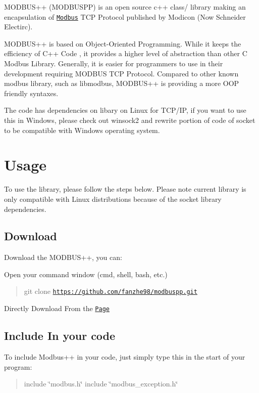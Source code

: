 M\+O\+D\+B\+U\+S++ (M\+O\+D\+B\+U\+S\+PP) is an open source c++ class/ library making an encapsulation of \href{https://en.wikipedia.org/wiki/Modbus}{\tt Modbus} T\+CP Protocol published by Modicon (Now Schneider Electirc).

M\+O\+D\+B\+U\+S++ is based on Object-\/\+Oriented Programming. While it keeps the efficiency of C++ Code , it provides a higher level of abstraction than other C Modbus Library. Generally, it is easier for programmers to use in their development requiring M\+O\+D\+B\+US T\+CP Protocol. Compared to other known modbus library, such as libmodbus, M\+O\+D\+B\+U\+S++ is providing a more O\+OP friendly syntaxes.

The code has dependencies on libary on Linux for T\+C\+P/\+IP, if you want to use this in Windows, please check out winsock2 and rewrite portion of code of socket to be compatible with Windows operating system.

\section*{Usage}

To use the library, please follow the steps below. Please note current library is only compatible with Linux distributions because of the socket library dependencies.

\subsection*{Download}

Download the M\+O\+D\+B\+U\+S++, you can\+:
\begin{DoxyItemize}
\item Open your command window (cmd, shell, bash, etc.) \begin{quote}
git clone \href{https://github.com/fanzhe98/modbuspp.git}{\tt https\+://github.\+com/fanzhe98/modbuspp.\+git} \end{quote}

\item Directly Download From the \href{https://github.com/fanzhe98/modbuspp.git}{\tt Page}
\end{DoxyItemize}

\subsection*{Include In your code}

To include Modbus++ in your code, just simply type this in the start of your program\+: \begin{quote}
include \char`\"{}modbus.\+h\char`\"{} include \char`\"{}modbus\+\_\+exception.\+h\char`\"{} \end{quote}


